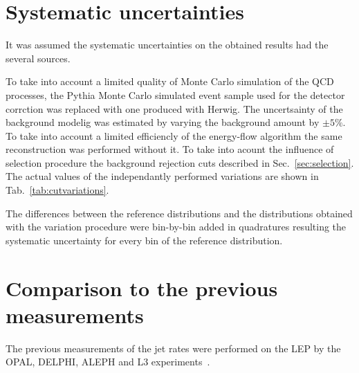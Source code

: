\FloatBarrier
\section{Systematic uncertainties}
\label{sec:systematic}
It was assumed the
 systematic uncertainties on the obtained results 
 had the several sources.

 To take into account a limited quality of Monte Carlo simulation of the
 QCD processes, the Pythia Monte Carlo simulated event sample used for the detector
 corrction was replaced with one produced with Herwig.
 The uncertsainty of the background modelig was estimated by varying the 
 background amount by $\pm5\%$.
To take into account a limited efficiencly of the energy-flow 
algorithm the same reconstruction was performed without it.
 To take into acount the influence of selection procedure
the background rejection cuts described in Sec.~\ref{sec:selection}. %
 The actual values of the independantly performed variations are shown in Tab.~\ref{tab:cutvariations}.
 \TABcutvariations
 
The differences between the reference distributions and the distributions obtained with 
the variation procedure were bin-by-bin added in quadratures resulting the systematic uncertainty for 
every bin of the reference distribution.
 








\section{Comparison to the previous measurements}                      
\label{sec:comparison}
The previous measurements of the jet rates were performed on the LEP by 
the OPAL, DELPHI, ALEPH and L3 experiments~\cite{Alexander:1996kh,
Ackerstaff:1997kk,Acton:1992fa,Akrawy:1989rg,Heister:2003aj,Abdallah:2003xz,Achard:2004sv}.





